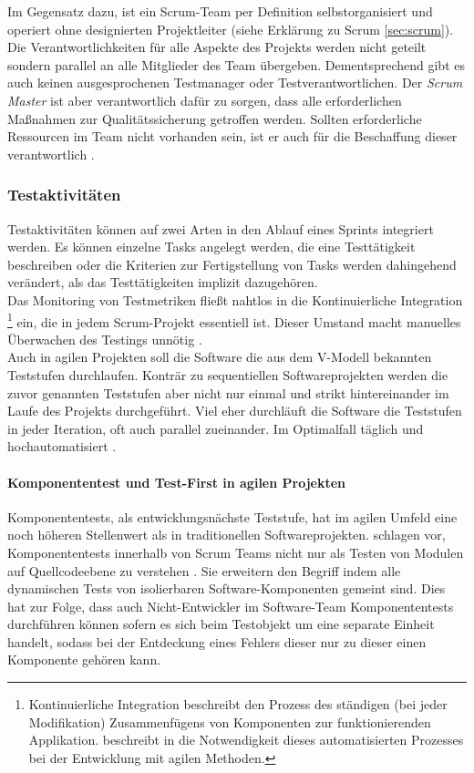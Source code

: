 Im Gegensatz dazu, ist ein Scrum-Team per Definition selbstorganisiert und operiert ohne designierten Projektleiter (siehe Erklärung zu Scrum \ref{sec:scrum}). Die Verantwortlichkeiten für alle Aspekte des Projekts werden nicht geteilt sondern parallel an alle Mitglieder des Team übergeben. Dementsprechend gibt es auch keinen ausgesprochenen Testmanager oder Testverantwortlichen. Der \textit{Scrum Master} ist aber verantwortlich dafür zu sorgen, dass alle erforderlichen Maßnahmen zur Qualitätssicherung getroffen werden. Sollten erforderliche Ressourcen im Team nicht vorhanden sein, ist er auch für die Beschaffung dieser verantwortlich \cite{linz_testing_2014}.\\

\subsubsection{Testaktivitäten}
Testaktivitäten können auf zwei Arten in den Ablauf eines Sprints integriert werden. Es können einzelne Tasks angelegt werden, die eine Testtätigkeit beschreiben oder die Kriterien zur Fertigstellung von Tasks werden dahingehend verändert, als das Testtätigkeiten implizit dazugehören.\\
Das Monitoring von Testmetriken fließt nahtlos in die Kontinuierliche Integration \footnote{Kontinuierliche Integration beschreibt den Prozess des ständigen (bei jeder Modifikation) Zusammenfügens von Komponenten zur funktionierenden Applikation. \citeauthor{linz_testing_2014} beschreibt in \cite{linz_testing_2014} die Notwendigkeit dieses automatisierten Prozesses bei der Entwicklung mit agilen Methoden.} ein, die in jedem Scrum-Projekt essentiell ist. Dieser Umstand macht manuelles Überwachen des Testings unnötig \cite{linz_testing_2014}.\\
Auch in agilen Projekten soll die Software die aus dem V-Modell bekannten Teststufen durchlaufen. Konträr zu sequentiellen Softwareprojekten werden die zuvor genannten Teststufen aber nicht nur einmal und strikt hintereinander im Laufe des Projekts durchgeführt. Viel eher durchläuft die Software die Teststufen in jeder Iteration, oft auch parallel zueinander. Im Optimalfall täglich und hochautomatisiert \cite{linz_testing_2014}.

\paragraph{Komponententest und Test-First in agilen Projekten}   
Komponententests, als entwicklungsnächste Teststufe, hat im agilen Umfeld eine noch höheren Stellenwert als in traditionellen Softwareprojekten. \citeauthor{spillner_software_2014} schlagen vor, Komponententests innerhalb von Scrum Teams nicht nur als Testen von Modulen auf Quellcodeebene zu verstehen \cite{spillner_software_2014}. Sie erweitern den Begriff indem alle dynamischen Tests von isolierbaren Software-Komponenten gemeint sind. Dies hat zur Folge, dass auch Nicht-Entwickler im Software-Team Komponententests durchführen können sofern es sich beim Testobjekt um eine separate Einheit handelt, sodass bei der Entdeckung eines Fehlers dieser nur zu dieser einen Komponente gehören kann.\\

